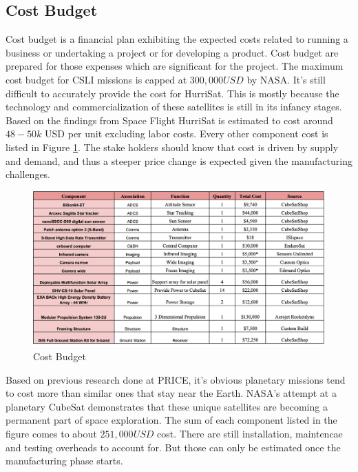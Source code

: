 \subsection{Cost Budget}

Cost budget is a financial plan exhibiting the expected costs related to running a business or undertaking a project or for developing a product. Cost budget are prepared for those expenses which are significant for the project. The maximum cost budget for CSLI missions is capped at $300,000USD$ by NASA. It's still difficult to accurately provide the cost for HurriSat. This is mostly because the technology and commercialization of these satellites is still in its infancy stages. Based on the findings from Space Flight \cite{SpaceFlight} HurriSat is estimated to cost around $48-50k$ USD per unit excluding labor costs. Every other component cost is listed in Figure \ref{fig:cost}. The stake holders should know that cost is driven by supply and demand, and thus a steeper price change is expected given the manufacturing challenges.\\
\vspace{1cm}
\FloatBarrier
\begin{figure}[hbt!]
    \centering
    \includegraphics[width=\textwidth, frame]{Images/cost.png}
    \caption{Cost Budget}
    \label{fig:cost}
\end{figure}

\vspace{1cm}

Based on previous research done at PRICE, it's obvious planetary missions tend to cost more than similar ones that stay near the Earth. NASA’s attempt at a planetary CubeSat demonstrates that these unique satellites are becoming a permanent part of space exploration. The sum of each component listed in the figure comes to about $251,000USD$ cost. There are still installation, maintencae and testing overheads to account for. But those can only be estimated once the manufacturing phase starts. \\

